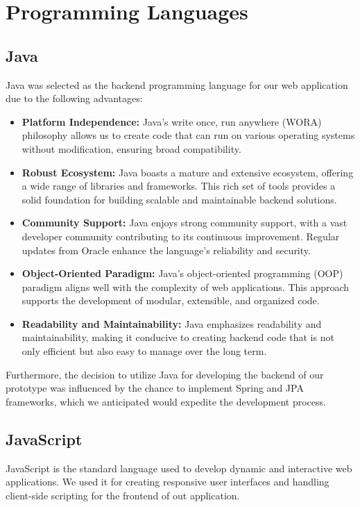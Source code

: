 \documentclass{Configuration_Files/Template}
\begin{document}
\section{Programming Languages}

\subsection{Java}
Java was selected as the backend programming language for our web application due to the following advantages:

\begin{itemize}
    \item \textbf{Platform Independence:} Java's write once, run anywhere (WORA) philosophy allows us to create code that can run on various operating systems without modification, ensuring broad compatibility.
    
    \item \textbf{Robust Ecosystem:} Java boasts a mature and extensive ecosystem, offering a wide range of libraries and frameworks. This rich set of tools provides a solid foundation for building scalable and maintainable backend solutions.
    
    \item \textbf{Community Support:} Java enjoys strong community support, with a vast developer community contributing to its continuous improvement. Regular updates from Oracle enhance the language's reliability and security.
    
    \item \textbf{Object-Oriented Paradigm:} Java's object-oriented programming (OOP) paradigm aligns well with the complexity of web applications. This approach supports the development of modular, extensible, and organized code.
    
    \item \textbf{Readability and Maintainability:} Java emphasizes readability and maintainability, making it conducive to creating backend code that is not only efficient but also easy to manage over the long term.
\end{itemize}

Furthermore, the decision to utilize Java for developing the backend of our prototype was influenced by the chance to implement Spring and JPA frameworks, which we anticipated would expedite the development process.

\subsection{JavaScript}
JavaScript is the standard language used to develop dynamic and interactive web applications. We used it for creating responsive user interfaces and handling client-side scripting for the frontend of out application.
\end{document}
